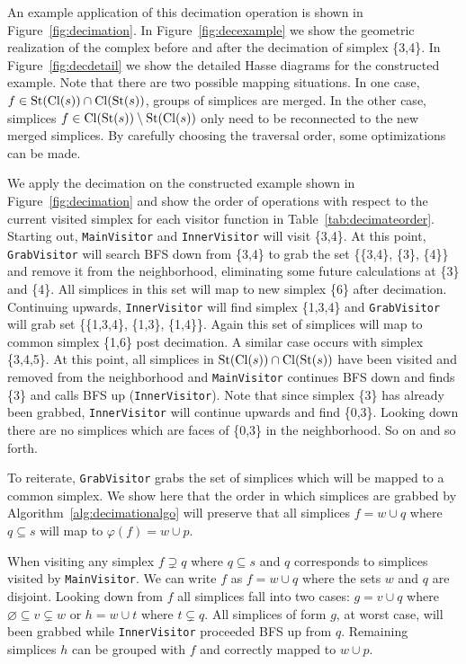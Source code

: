 		\par An example application of this decimation operation is shown in Figure~\ref{fig:decimation}.
		In Figure~\ref{fig:decexample} we show the geometric realization of the complex before and after the decimation of simplex \{3,4\}.
		In Figure~\ref{fig:decdetail} we show the detailed Hasse diagrams for the constructed example. Note that there are two possible mapping situations.
		In one case, $f \in \operatorname{St}(\operatorname{Cl}(s)) \cap \operatorname{Cl}(\operatorname{St}(s))$, groups of simplices are merged.
		In the other case, simplices $f \in \operatorname{Cl}(\operatorname{St}(s)) \setminus \operatorname{St}(\operatorname{Cl}(s))$ only need to be reconnected to the new merged simplices.
		By carefully choosing the traversal order, some optimizations can be made.

		\par We apply the decimation on the constructed example shown in Figure~\ref{fig:decimation} and show the order of operations with respect to the current visited simplex for each visitor function in Table~\ref{tab:decimateorder}.
		Starting out, \verb|MainVisitor| and \verb|InnerVisitor| will visit \{3,4\}.
		At this point, \verb|GrabVisitor| will search BFS down from \{3,4\} to grab the set \{\{3,4\}, \{3\}, \{4\}\} and remove it from the neighborhood, eliminating some future calculations at \{3\} and \{4\}.
		All simplices in this set will map to new simplex \{6\} after decimation.
		Continuing upwards, \verb|InnerVisitor| will find simplex \{1,3,4\} and \verb|GrabVisitor| will grab set \{\{1,3,4\}, \{1,3\}, \{1,4\}\}.
		Again this set of simplices will map to common simplex \{1,6\} post decimation.
		A similar case occurs with simplex \{3,4,5\}. At this point, all simplices in $\operatorname{St}(\operatorname{Cl}(s)) \cap \operatorname{Cl}(\operatorname{St}(s))$ have been visited and removed from the neighborhood and \verb|MainVisitor| continues BFS down and finds \{3\} and calls BFS up (\verb|InnerVisitor|).
		Note that since simplex \{3\} has already been grabbed, \verb|InnerVisitor| will continue upwards and find \{0,3\}.
		Looking down there are no simplices which are faces of \{0,3\} in the neighborhood. So on and so forth.

		\par To reiterate, \verb|GrabVisitor| grabs the set of simplices which will be mapped to a common simplex.
		We show here that the order in which simplices are grabbed by Algorithm~\ref{alg:decimationalgo} will preserve that all simplices $f = w\cup q$ where $q\subseteq s$ will map to $\varphi(f) = w\cup p$.

		\par When visiting any simplex $f\supsetneq q$ where $q\subseteq s$ and $q$ corresponds to simplices visited by \verb|MainVisitor|.
		We can write $f$ as $f = w\cup q$ where the sets $w$ and $q$ are disjoint.
		Looking down from $f$ all simplices fall into two cases: $g = v\cup q$ where $\varnothing \subseteq v\subsetneq w$ or $h = w\cup t$ where $t\subsetneq q$.
		All simplices of form $g$, at worst case, will been grabbed while \verb|InnerVisitor| proceeded BFS up from $q$.
		Remaining simplices $h$ can be grouped with $f$ and correctly mapped to $w\cup p$.

